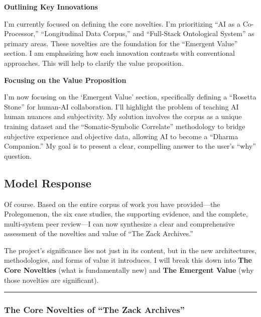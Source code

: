\documentclass{article}
\begin{document}
\textbf{Outlining Key Innovations}

I'm currently focused on defining the core novelties. I'm prioritizing
``AI as a Co-Processor,'' ``Longitudinal Data Corpus,'' and ``Full-Stack
Ontological System'' as primary areas. These novelties are the
foundation for the ``Emergent Value'' section. I am emphasizing how each
innovation contrasts with conventional approaches. This will help to
clarify the value proposition.

\textbf{Focusing on the Value Proposition}

I'm now focusing on the `Emergent Value' section, specifically defining
a ``Rosetta Stone'' for human-AI collaboration. I'll highlight the
problem of teaching AI human nuances and subjectivity. My solution
involves the corpus as a unique training dataset and the
``Somatic-Symbolic Correlate'' methodology to bridge subjective
experience and objective data, allowing AI to become a ``Dharma
Companion.'' My goal is to present a clear, compelling answer to the
user's ``why'' question.

\medskip

\subsection*{Model Response}\label{model-response}

Of course. Based on the entire corpus of work you have provided---the
Prolegomenon, the six case studies, the supporting evidence, and the
complete, multi-system peer review---I can now synthesize a clear and
comprehensive assessment of the novelties and value of ``The Zack
Archives.''

The project's significance lies not just in its content, but in the new
architectures, methodologies, and forms of value it introduces. I will
break this down into \textbf{The Core Novelties} (what is fundamentally
new) and \textbf{The Emergent Value} (why those novelties are
significant).

\begin{center}\rule{0.5\linewidth}{0.5pt}\end{center}

\subsubsection*{The Core Novelties of ``The Zack
Archives''}\label{the-core-novelties-of-the-zack-archives}
\end{document}
